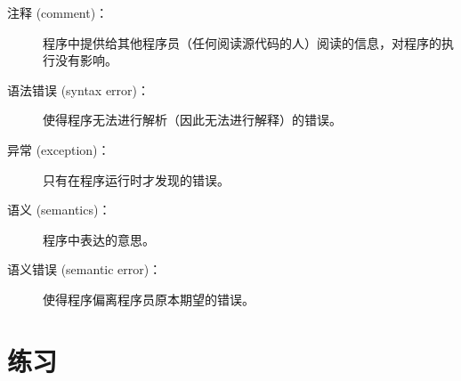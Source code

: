 \begin{description}
\item[注释 (comment)：]  程序中提供给其他程序员（任何阅读源代码的人）阅读的信息，对程序的执行没有影响。
  

\item[语法错误 (syntax error)：]  使得程序无法进行解析（因此无法进行解释）的错误。
  

\item[异常 (exception)：]  只有在程序运行时才发现的错误。
  

\item[语义 (semantics)：]  程序中表达的意思。
  

\item[语义错误 (semantic error)：]  使得程序偏离程序员原本期望的错误。
  

\end{description}


\section{练习}


